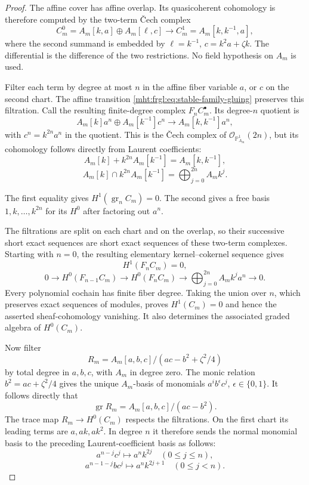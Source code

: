 \begin{proof}
The affine cover has affine overlap. Its quasicoherent cohomology
is therefore computed by the two-term \v Cech complex
\[
 C_m^0=A_m[k,a]\oplus A_m[\ell,c]
 \longrightarrow C_m^1=A_m[k,k^{-1},a],
\]
where the second summand is embedded by
$\ell=k^{-1}$, $c=k^2a+\zeta k$.
The differential is the difference of the two restrictions.
No field hypothesis on $A_m$ is used.

Filter each term by degree at most $n$ in the affine fiber
variable $a$, or $c$ on the second chart. The affine transition
\eqref{mht:frgl:eq:stable-family-gluing} preserves this filtration.
Call the resulting finite-degree complex $F_nC_m^\bullet$.
Its degree-$n$ quotient is
\[
 A_m[k]a^n\oplus A_m[k^{-1}]c^n
 \longrightarrow A_m[k,k^{-1}]a^n,
\]
with $c^n=k^{2n}a^n$ in the quotient. This is the \v Cech
complex of $\mathcal O_{\mathbb P^1_{A_m}}(2n)$, but its
cohomology follows directly from Laurent coefficients:
\[
 A_m[k]+k^{2n}A_m[k^{-1}]=A_m[k,k^{-1}],
\]
\[
 A_m[k]\cap k^{2n}A_m[k^{-1}]
       =\bigoplus_{j=0}^{2n}A_m k^j.
\]

The first equality gives $H^1(\operatorname{gr}_nC_m)=0$. The second gives a free basis $1,k,\ldots,k^{2n}$ for its
$H^0$ after factoring out $a^n$.

The filtrations are split on each chart and on the overlap,
so their successive short exact sequences are short exact
sequences of these two-term complexes. Starting with $n=0$,
the resulting elementary kernel--cokernel sequence gives
\[
 H^1(F_nC_m)=0,
\]
\[
 0\longrightarrow H^0(F_{n-1}C_m)
  \longrightarrow H^0(F_nC_m)
  \longrightarrow\bigoplus_{j=0}^{2n}A_m k^ja^n
  \longrightarrow0.
\]
Every polynomial cochain has finite fiber degree. Taking the
union over $n$, which preserves exact sequences of modules,
proves $H^1(C_m)=0$ and hence the asserted sheaf-cohomology
vanishing. It also determines the associated graded algebra
of $H^0(C_m)$.

Now filter
\[
 R_m=A_m[a,b,c]/(ac-b^2+\zeta^2/4)
\]
by total degree in $a,b,c$, with $A_m$ in degree zero.
The monic relation $b^2=ac+\zeta^2/4$ gives the unique
$A_m$-basis of monomials $a^ib^\epsilon c^j$,
$\epsilon\in\{0,1\}$. It follows directly that
\[
 \operatorname{gr}R_m=A_m[a,b,c]/(ac-b^2).
\]
The trace map $R_m\to H^0(C_m)$ respects the filtrations.
On the first chart its leading terms are $a,ak,ak^2$.
In degree $n$ it therefore sends the normal monomial basis
to the preceding Laurent-coefficient basis as follows:
\[
 a^{n-j}c^j\longmapsto a^n k^{2j}
       \quad(0\le j\le n),
\]
\[
 a^{n-1-j}bc^j\longmapsto a^n k^{2j+1}
       \quad(0\le j<n).
\]


\end{proof}
